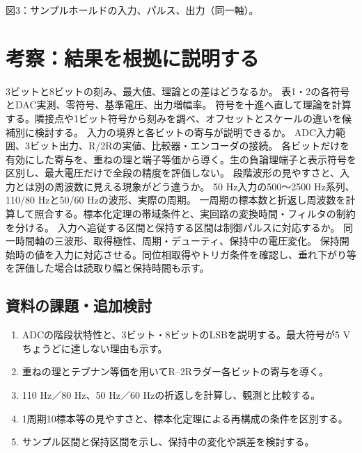 \documentclass[lualatex,a4paper,10pt]{jlreq}
\begin{document}
\writing{38mm}
図3：サンプルホールドの入力、パルス、出力（同一軸）。
\writing{35mm}
\clearpage\section{考察：結果を根拠に説明する}\label{sec:auto6}
{3ビットと8ビットの刻み、最大値、理論との差はどうなるか。}
{表1・2の各符号とDAC実測、零符号、基準電圧、出力増幅率。}
{符号を十進へ直して理論を計算する。隣接点や1ビット符号から刻みを調べ、オフセットとスケールの違いを候補別に検討する。}
{入力の境界と各ビットの寄与が説明できるか。}
{ADC入力範囲、3ビット出力、R/2Rの実値、比較器・エンコーダの接続。}
{各ビットだけを有効にした寄与を、重ねの理と端子等価から導く。生の負論理端子と表示符号を区別し、最大電圧だけで全段の精度を評価しない。}
{段階波形の見やすさと、入力とは別の周波数に見える現象がどう違うか。}
{50 Hz入力の500〜2500 Hz系列、110/80 Hzと50/60 Hzの波形、実際の周期。}
{一周期の標本数と折返し周波数を計算して照合する。標本化定理の帯域条件と、実回路の変換時間・フィルタの制約を分ける。}
{入力へ追従する区間と保持する区間は制御パルスに対応するか。}
{同一時間軸の三波形、取得極性、周期・デューティ、保持中の電圧変化。}
{保持開始時の値を入力に対応させる。同位相取得やトリガ条件を確認し、垂れ下がり等を評価した場合は読取り幅と保持時間も示す。}
\subsection{資料の課題・追加検討}
\begin{enumerate}
\item ADCの階段状特性と、3ビット・8ビットのLSBを説明する。最大符号が5 Vちょうどに達しない理由も示す。
\item 重ねの理とテブナン等価を用いてR--2Rラダー各ビットの寄与を導く。
\item 110 Hz／80 Hz、50 Hz／60 Hzの折返しを計算し、観測と比較する。
\item 1周期10標本等の見やすさと、標本化定理による再構成の条件を区別する。
\item サンプル区間と保持区間を示し、保持中の変化や誤差を検討する。
\end{enumerate}
\end{document}
